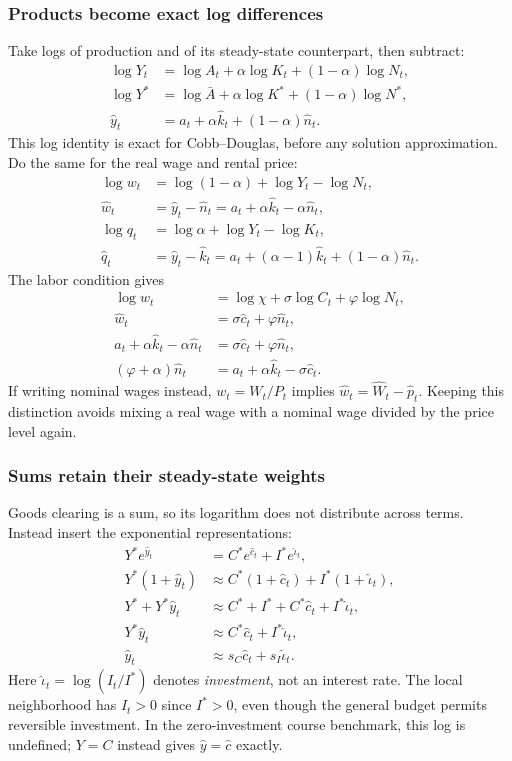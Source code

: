 \subsubsection{Products become exact log differences}

Take logs of production and of its steady-state counterpart, then subtract:
\begin{align}
\log Y_t&=\log A_t+\alpha\log K_t+(1-\alpha)\log N_t,\\
\log Y^*&=\log\bar A+\alpha\log K^*+(1-\alpha)\log N^*,\\
\hat y_t&=a_t+\alpha\hat k_t+(1-\alpha)\hat n_t.\label{eq:rbc-linear-y}
\end{align}
This log identity is exact for Cobb--Douglas, before any solution approximation.
Do the same for the real wage and rental price:
\begin{align}
\log w_t&=\log(1-\alpha)+\log Y_t-\log N_t,\\
\hat w_t&=\hat y_t-\hat n_t
 =a_t+\alpha\hat k_t-\alpha\hat n_t,\label{eq:rbc-linear-w}\\
\log q_t&=\log\alpha+\log Y_t-\log K_t,\\
\hat q_t&=\hat y_t-\hat k_t
 =a_t+(\alpha-1)\hat k_t+(1-\alpha)\hat n_t.\label{eq:rbc-linear-q}
\end{align}
The labor condition gives
\begin{align}
\log w_t&=\log\chi+\sigma\log C_t+\varphi\log N_t,\\
\hat w_t&=\sigma\hat c_t+\varphi\hat n_t,\\
a_t+\alpha\hat k_t-\alpha\hat n_t
 &=\sigma\hat c_t+\varphi\hat n_t,\\
(\varphi+\alpha)\hat n_t
 &=a_t+\alpha\hat k_t-\sigma\hat c_t.\label{eq:rbc-linear-n}
\end{align}
If writing nominal wages instead, $w_t=W_t/P_t$ implies
$\hat w_t=\hat W_t-\hat p_t$. Keeping this distinction avoids mixing a real
wage with a nominal wage divided by the price level again.

\subsubsection{Sums retain their steady-state weights}

Goods clearing is a sum, so its logarithm does not distribute across terms.
Instead insert the exponential representations:
\begin{align}
Y^*e^{\hat y_t}&=C^*e^{\hat c_t}+I^*e^{\hat\iota_t},\\
Y^*(1+\hat y_t)&\approx C^*(1+\hat c_t)+I^*(1+\hat\iota_t),\\
Y^*+Y^*\hat y_t&\approx C^*+I^*+C^*\hat c_t+I^*\hat\iota_t,\\
Y^*\hat y_t&\approx C^*\hat c_t+I^*\hat\iota_t,\\
\hat y_t&\approx s_C\hat c_t+s_I\hat\iota_t.\label{eq:rbc-linear-resources}
\end{align}
Here $\hat\iota_t=\log(I_t/I^*)$ denotes \emph{investment}, not an interest
rate. The local neighborhood has $I_t>0$ since $I^*>0$, even though the general
budget permits reversible investment. In the zero-investment course benchmark,
this log is undefined; $Y=C$ instead gives $\hat y=\hat c$ exactly.

